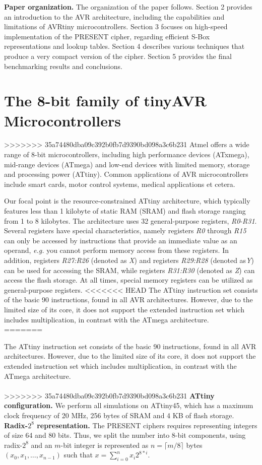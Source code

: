 \documentclass[11pt]{article}
\begin{document}
\textbf{Paper organization.} The organization of the paper follows. Section 2 provides an introduction to the AVR architecture, including the capabilities and limitations of AVRtiny microcontrollers. Section 3 focuses on high-speed implementation of the PRESENT cipher, regarding efficient S-Box representations and lookup tables. Section 4 describes various techniques that produce a very compact version of the cipher. Section 5 provides the final benchmarking results and conclusions.

\section{The 8-bit family of tinyAVR Microcontrollers}
>>>>>>> 35a74480dba09c392b0fb7d9390bd098a3c6b231
Atmel offers a wide range of 8-bit microcontrollers, including high performance devices (ATxmega), mid-range devices (ATmega) and low-end devices with limited memory, storage and processing power (ATtiny). Common applications of AVR microcontrollers include smart cards, motor control systems, medical applications et cetera. 

Our focal point is the resource-constrained ATtiny architecture, which typically features less than 1 kilobyte of static RAM (SRAM) and flash storage ranging from 1 to 8 kilobytes. The architecture uses 32 general-purpose registers, \textit{R0}-\textit{R31}.
Several registers have special characteristics, namely registers \textit{R0} through \textit{R15} can only be accessed by instructions that provide an immediate value as an operand, \emph{e.g.} you cannot perform memory access from these registers. In addition, registers \textit{R27:R26} (denoted as \emph{X}) and registers \textit{R29:R28} (denoted as\emph{Y}) can be used for accessing the SRAM, while registers \textit{R31:R30} (denoted as \emph{Z}) can access the flash storage. At all times, special memory registers can be utilized as general-purpose registers.
<<<<<<< HEAD
The ATtiny instruction set consists of the basic 90 instructions, found in all AVR architectures. However, due to the limited size of its core, it does not support the extended instruction set which includes multiplication, in contrast with the ATmega architecture.\\
=======

The ATtiny instruction set consists of the basic 90 instructions, found in all AVR architectures. However, due to the limited size of its core, it does not support the extended instruction set which includes multiplication, in contrast with the ATmega architecture. \\\\
>>>>>>> 35a74480dba09c392b0fb7d9390bd098a3c6b231
\textbf{ATtiny configuration.} We perform all simulations on ATtiny45, which has a maximum clock frequency of 20 MHz, 256 bytes of SRAM and 4 KB of flash storage.\\
\textbf{Radix-$2^8$ representation.} The PRESENT ciphers requires representing integers of size 64 and 80 bits. Thus, we split the number into 8-bit components, using radix-$2^8$ and an $m$-bit integer is represented as $n=\lceil{m/8}\rceil$ bytes $(x_0,x_1,\dots,x_{n-1})$ such that $x=\sum_{i=0}^n{x_i 2^{8*i}}$.
\end{document}
